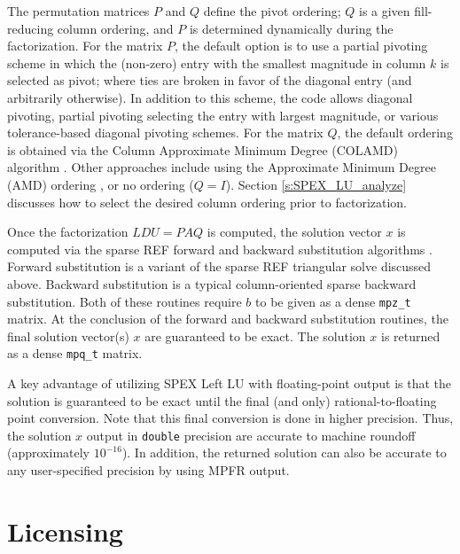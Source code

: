 \documentclass[12pt]{report}
\theoremstyle{definition}
\begin{document}
The permutation matrices $P$ and $Q$ define the pivot ordering; $Q$ is a given
fill-reducing column ordering, and $P$ is determined dynamically during the
factorization.  For the matrix $P$, the default option is to use a partial
pivoting scheme in which the (non-zero) entry with the smallest magnitude in column $k$ is selected as pivot; where ties are broken in favor of the diagonal entry (and arbitrarily otherwise). In addition to this scheme,
the code allows diagonal pivoting, partial pivoting selecting the entry with largest magnitude, or various tolerance-based diagonal pivoting schemes. For the matrix
$Q$, the default ordering is obtained via the Column Approximate Minimum Degree (COLAMD)
algorithm \cite{davis2004algorithmcolamd,davis2004column}. Other approaches
include using the Approximate Minimum Degree (AMD) ordering
\cite{amestoy1996approximate,amestoy2004algorithmamd}, or no ordering ($Q=I$). Section \ref{s:SPEX_LU_analyze} discusses how to select the desired column ordering prior to factorization.

Once the factorization $L D U = P A Q$ is computed, the solution vector 
$x$ is computed via the sparse REF forward and backward substitution algorithms \cite{lourenco2019exact}. 
Forward substitution is a variant of the sparse REF triangular solve discussed above. Backward substitution is a typical column-oriented sparse backward substitution. Both of these routines require $b$ to be given as a dense \verb|mpz_t| matrix. At the conclusion of the forward and 
backward substitution routines, the final solution vector(s) $x$ are guaranteed to be exact.  The solution $x$ is returned as a dense \verb|mpq_t| matrix.

A key advantage of utilizing SPEX Left LU with floating-point output is that the solution is guaranteed to be exact until the final (and only) rational-to-floating point conversion. Note that this final conversion is done in higher precision. Thus, the solution $x$ output in \verb|double| precision are accurate to machine roundoff (approximately $10^{-16}$). In addition, the returned solution can also be accurate to any user-specified precision by using MPFR output.

\section{Licensing} \label{s:LeftLU:licensing}
\end{document}

